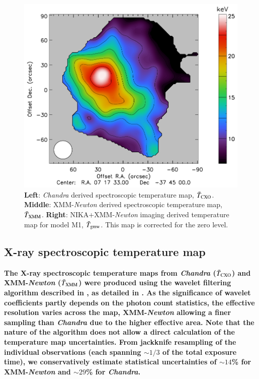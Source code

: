 \documentclass[twocolumn,traditabstract]{aa}
\begin{document}
\begin{figure}[h]
\includegraphics[trim=1.6cm 0cm 0cm 0cm, clip=true, totalheight=6.1cm]{Figure/Thermo_TSZclean1.pdf}
\caption{\footnotesize{{\bf Left}: \textit{Chandra} derived spectroscopic temperature map, $\bar{T}_{\rm CXO}$. {\bf Middle}: XMM-\textit{Newton} derived spectroscopic temperature map, $\bar{T}_{\rm XMM}$. {\bf Right}: NIKA+XMM-\textit{Newton} imaging derived temperature map for model M1, $\bar{T}_{\rm gmw}$. This map is corrected for the zero level.}}
\label{fig:T_maps}
\end{figure}

\subsection{X-ray spectroscopic temperature map}\label{sec:Xray_spectroscopic_temperature_map}
{\bf The X-ray spectroscopic temperature maps from \textit{Chandra} ($\bar{T}_{\rm CXO}$) and XMM-\textit{Newton} ($\bar{T}_{\rm XMM}$) were produced using the wavelet filtering algorithm described in \cite{Bourdin2008}, as detailed in \cite{Adam2016b}. As the significance of wavelet coefficients partly depends on the photon count statistics, the effective resolution varies across the map, XMM-\textit{Newton} allowing a finer sampling than \textit{Chandra} due to the higher effective area. Note that the nature of the algorithm does not allow a direct calculation of the temperature map uncertainties. From jackknife resampling of the individual observations (each spanning $\sim 1/3$ of the total exposure time), we conservatively estimate statistical uncertainties of $\sim 14$\% for XMM-\textit{Newton} and $\sim 29$\% for \textit{Chandra}.}
\end{document}
